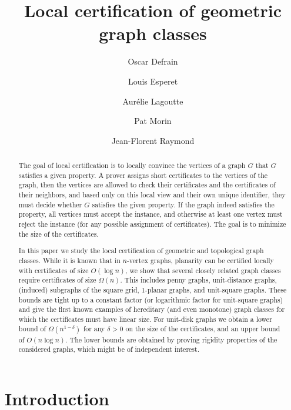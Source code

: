 \documentclass[a4paper,reqno, 12pt]{amsart}
\title{Local certification of geometric graph classes}
\author[O.~Defrain]{Oscar Defrain}
\author[L.~Esperet]{Louis Esperet}
\author[A.~Lagoutte]{Aurélie Lagoutte}
\author[P.~Morin]{Pat Morin}
\author[J.-F.~Raymond]{Jean-Florent Raymond}
\begin{document}
\begin{abstract}
  The goal of local certification is to locally convince the vertices of a
  graph $G$ that $G$ satisfies a given property. A prover assigns short
  certificates to the vertices of the graph, then the vertices are
  allowed to check their  certificates and the certificates of their neighbors, and based only
  on this local view and their own unique identifier, they must decide whether $G$ satisfies the given
  property. If the graph indeed satisfies the property, all vertices
  must accept the instance, and otherwise at least one vertex must
  reject the instance (for any possible assignment of
  certificates). The goal is to minimize the size of the certificates.
  
In this paper we study the local certification of  geometric and
topological graph
classes. While it is known that in $n$-vertex graphs, planarity can be certified locally
with certificates of size $O(\log n)$, we show that several closely
related graph classes require certificates of size $\Omega(n)$. This
includes penny graphs, unit-distance graphs, (induced) subgraphs of
the square grid, 1-planar graphs, and unit-square graphs. These bounds
are tight up to a constant factor (or logarithmic factor for unit-square graphs) and give the first known examples
of hereditary (and even monotone) graph classes
for which the certificates must have linear size. For
unit-disk graphs we obtain a lower bound of $\Omega(n^{1-\delta})$
for any $\delta>0$ on the size of the certificates, and an upper bound
of $O(n \log n)$.
The lower bounds are obtained by proving rigidity properties of the
considered graphs, which might be of independent interest.
\end{abstract}

\maketitle

\section{Introduction}
\end{document}

